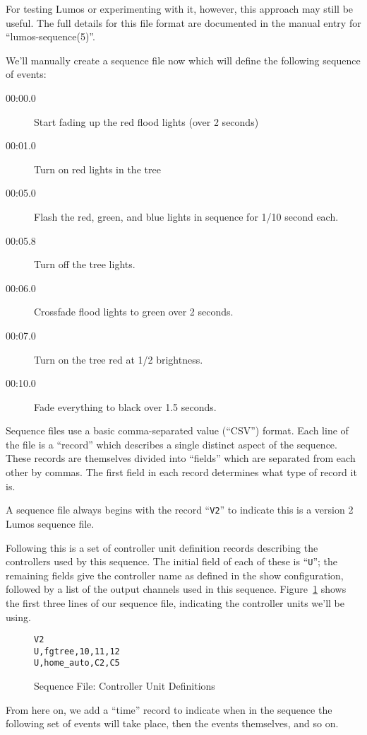 \documentclass{article}
\begin{document}
For testing Lumos or experimenting with it, however, this approach may still
be useful.  The full details for this file format are documented in the manual
entry for ``lumos-sequence(5)''.

We'll manually create a sequence file now which will define the following
sequence of events:
\begin{description}
	\item[00:00.0]
		Start fading up the red flood lights (over 2 seconds)
	\item[00:01.0]
		Turn on red lights in the tree
	\item[00:05.0]
		Flash the red, green, and blue lights in sequence for 1/10 second
		each.
	\item[00:05.8]
		Turn off the tree lights.
	\item[00:06.0]
		Crossfade flood lights to green over 2 seconds.
	\item[00:07.0]
		Turn on the tree red at 1/2 brightness.
	\item[00:10.0]
		Fade everything to black over 1.5 seconds.
\end{description}

Sequence files use a basic comma-separated value (``CSV'') format.  Each 
line of the file is a ``record'' which describes a single distinct aspect
of the sequence.  These records are themselves divided into ``fields'' which
are separated from each other by commas.  The first field in each record
determines what type of record it is.

A sequence file always begins with the record ``{\tt V2}'' to indicate this is a
version 2 Lumos sequence file.  

Following this is a set of controller unit
definition records describing the controllers used by this sequence.  
The initial field of each of
these  is ``{\tt U}''; the remaining fields give the controller name as 
defined in the
show configuration, followed by a list of the output channels used in this
sequence.  Figure~\ref{seq:u}
shows the first three lines of our sequence file, indicating the controller
units we'll be using.

\begin{figure}[hbtp]
\begin{verbatim}
V2
U,fgtree,10,11,12
U,home_auto,C2,C5
\end{verbatim}
\caption{Sequence File: Controller Unit Definitions}
\label{seq:u}
\end{figure}

From here on, we add a ``time'' record to indicate when in the sequence
the following set of events will take place, then the events themselves, and
so on.  
\end{document}
